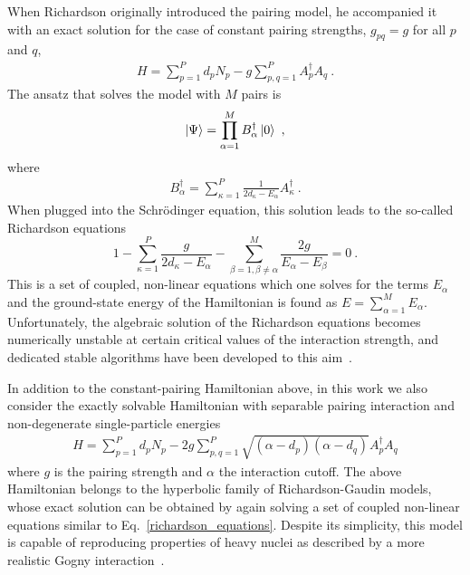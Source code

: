\documentclass[aps,pre,floatfix,showpacs,twocolumn, preprintnumbers]{revtex4-1}
\begin{document}
When Richardson originally introduced the pairing model, he accompanied it with an exact solution for the case of constant pairing strengths, $g_{pq}=g$ for all $p$ and $q$,
\begin{align}
\label{pairing_model_hamiltonian_constant_g}
H=\sum_{p=1}^{P}d_pN_p-g\sum_{p,q=1}^{P}A^\dagger_pA_q\ .
\end{align}
The ansatz that solves the model with $M$ pairs is
\begin{align}
\label{richardson_ansatz}
\ket{\Psi}=\prod_{\alpha=1}^M B^\dagger_{\alpha}\ket{0}\ ,
\end{align}
where
\begin{align}
B^\dagger_\alpha=\sum_{\kappa=1}^P\frac{1}{2d_\kappa-E_\alpha}A^\dagger_\kappa\ .
\end{align}
When plugged into the Schr\"odinger equation, this solution leads to the so-called Richardson equations~\cite{Richardson:1963a,Richardson:1963b}
\begin{equation}
\label{richardson_equations}
1 - \sum_{\kappa=1}^P \frac{g}{2d_\kappa-E_\alpha}
- \sum_{\beta=1,\beta\neq\alpha}^M \frac{2g}{E_\alpha-E_\beta}
= 0\ .
\end{equation}
This is a set of coupled, non-linear equations which one solves for the terms $E_\alpha$ and the ground-state energy of the Hamiltonian is found as $E=\sum_{\alpha=1}^M E_\alpha$. Unfortunately, the algebraic solution of the Richardson equations becomes numerically unstable at certain critical values of the interaction strength, and dedicated stable algorithms have been developed to this aim~\cite{Rombouts:2003zd,Guan:2022CoPhC}.


In addition to the constant-pairing Hamiltonian above, in this work we also consider the exactly solvable Hamiltonian with separable pairing interaction and non-degenerate single-particle energies 
\begin{align}
\label{pairing_model_hamiltonian_separable_g}
H=\sum_{p=1}^Pd_pN_p- 2 g \sum_{p,q=1}^P\sqrt{(\alpha-d_p)(\alpha-d_q)} A^\dagger_pA_q
\end{align}
where $g$ is the pairing strength and $\alpha$ the interaction cutoff. The above Hamiltonian belongs to the hyperbolic family of Richardson-Gaudin models, whose exact solution can be obtained by again solving a set of coupled non-linear equations similar to Eq.~\eqref{richardson_equations}. Despite its simplicity, this model is capable of reproducing properties of heavy nuclei as described by a more realistic Gogny interaction~\cite{Dukelsky:2011nb}. 
\end{document}
